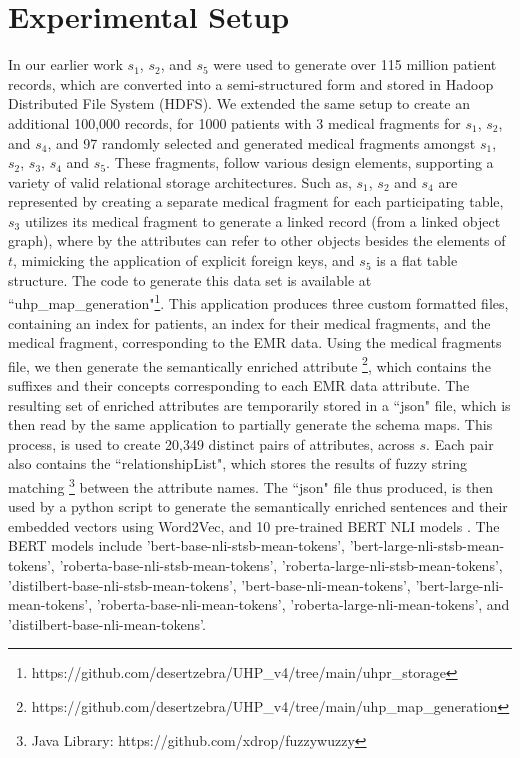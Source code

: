 
\section*{Experimental Setup}
\label{experimentalSetup}
In our earlier work \cite{Satti2020} $s_1$, $s_2$, and $s_5$ were used to generate over 115 million patient records, which are converted into a semi-structured form and stored in Hadoop Distributed File System (HDFS). We extended the same setup to create an additional 100,000 records, for 1000 patients with 3 medical fragments for $s_1$, $s_2$, and $s_4$, and 97 randomly selected and generated medical fragments amongst $s_1$, $s_2$, $s_3$, $s_4$ and $s_5$. These fragments, follow various design elements, supporting a variety of valid relational storage architectures. Such as, $s_1$, $s_2$ and $s_4$ are represented by creating a separate medical fragment for each participating table, $s_3$ utilizes its medical fragment to generate a linked record (from a linked object graph), where by the attributes can refer to other objects besides the elements of $t$, mimicking the application of explicit foreign keys, and $s_5$ is a flat table structure. The code to generate this data set is available at ``uhp\_map\_generation"\footnote{https://github.com/desertzebra/UHP\_v4/tree/main/uhpr\_storage}. This application produces three custom formatted files, containing an index for patients, an index for their medical fragments, and the medical fragment, corresponding to the EMR data. Using the medical fragments file, we then generate the semantically enriched attribute \footnote{https://github.com/desertzebra/UHP\_v4/tree/main/uhp\_map\_generation}, which contains the suffixes and their concepts corresponding to each EMR data attribute. The resulting set of enriched attributes are temporarily stored in a ``json" file, which is then read by the same application to partially generate the schema maps. This process, is used to create 20,349 distinct pairs of attributes, across $s$. Each pair also contains the ``relationshipList", which stores the results of fuzzy string matching\cite{FuzzyWuzzy} \footnote{Java Library: https://github.com/xdrop/fuzzywuzzy} between the attribute names. 
The ``json" file thus produced, is then used by a python script to generate the semantically enriched sentences and their embedded vectors using Word2Vec, and 10 pre-trained BERT NLI models \cite{reimers-2019-sentence-bert}. The BERT models include 'bert-base-nli-stsb-mean-tokens', 'bert-large-nli-stsb-mean-tokens', 'roberta-base-nli-stsb-mean-tokens', 'roberta-large-nli-stsb-mean-tokens', 'distilbert-base-nli-stsb-mean-tokens', 'bert-base-nli-mean-tokens', 'bert-large-nli-mean-tokens', 'roberta-base-nli-mean-tokens', 'roberta-large-nli-mean-tokens', and 'distilbert-base-nli-mean-tokens'. 

